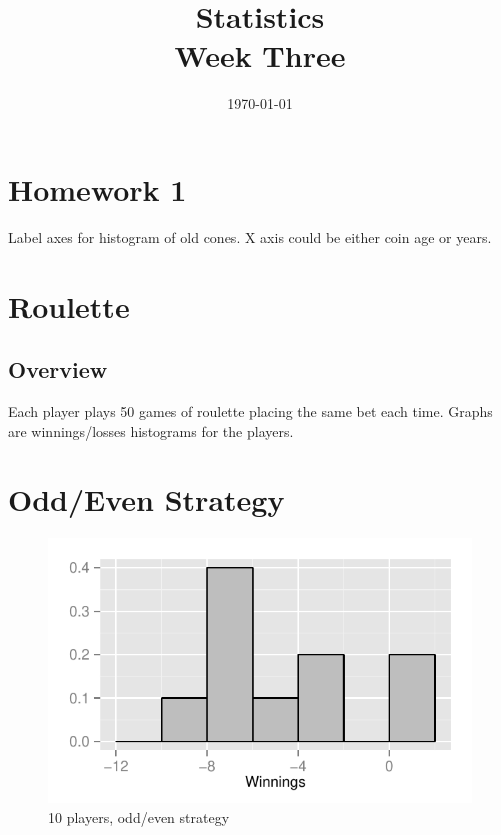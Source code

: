 \documentclass[landscape]{exam}
\author{}
\date{\today}
\title{Statistics \\ Week Three}
\begin{document}
  \maketitle
  \tableofcontents
  \section{Homework 1}

  Label axes for histogram of old cones. X axis could be either coin age or
  years.

  \section{Roulette}

  \subsection{Overview}

  Each player plays 50 games of roulette placing the same bet each time. Graphs
  are winnings/losses histograms for the players. 

  \section{Odd/Even Strategy} %
  
  \begin{figure}[H]
    \centering
    \includegraphics[scale = 0.9]{figures/roulette/18_10_50_fraction.pdf}
    \caption{10 players, odd/even strategy}
  \end{figure}
\end{document}
